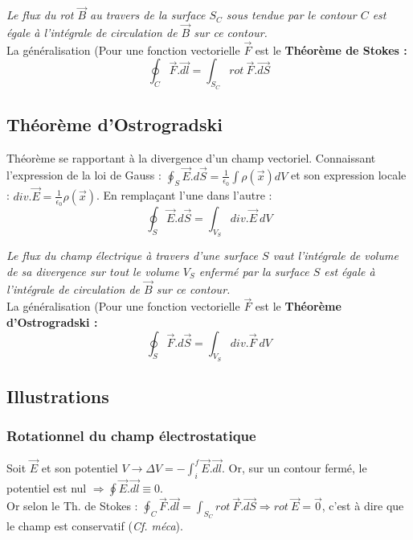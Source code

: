 \documentclass	[11pt, a4paper, openany]{book}
\begin{document}
\textit{Le flux du rot $\vec{B}$ au travers de la surface $S_C$ sous tendue par le contour $C$ est égale à l'intégrale de circulation de $\vec{B}$ sur ce contour.}\\
La généralisation (Pour une fonction vectorielle $\vec{F}$ est le \textbf{Théorème de Stokes :}
\begin{equation}
	\oint_C \vec{F}.\vec{dl} = \int_{S_C} rot\ \vec{F}.\vec{dS}
\end{equation}


\subsection{Théorème d'Ostrogradski}
Théorème se rapportant à la divergence d'un champ vectoriel. Connaissant l'expression de la loi de Gauss : $\oint_S \vec{E}.d\vec{S} = \frac{1}{\epsilon_0} \int \rho(\vec{x})dV$ et son expression locale : $div.\vec{E} = \frac{1}{\epsilon_0}\rho(\vec{x})$. En remplaçant l'une dans l'autre : 
\begin{equation}
	\oint_S \vec{E}.d\vec{S} = \int_{V_S} div.\vec{E}\ dV
\end{equation}

\textit{Le flux du champ électrique à travers d'une surface $S$ vaut l'intégrale de volume de sa divergence sur tout le volume $V_S$ enfermé par la surface $S$ est égale à l'intégrale de circulation de $\vec{B}$ sur ce contour.}\\

La généralisation (Pour une fonction vectorielle $\vec{F}$ est le \textbf{Théorème d'Ostrogradski :}
\begin{equation}
	\oint_S \vec{F}.d\vec{S} = \int_{V_S} div.\vec{F}\ dV
\end{equation}

\subsection{Illustrations}
\subsubsection{Rotationnel du champ électrostatique}
Soit $\vec{E}$ et son potentiel $V \rightarrow \Delta V = - \int_i^f \vec{E}.\vec{dl}$. Or, sur un contour fermé, le potentiel est nul $\Rightarrow \oint \vec{E}.\vec{dl} \equiv 0$.\\

Or selon le Th. de Stokes : $\oint_C \vec{F}.\vec{dl} = \int_{S_C} rot\ \vec{F}.\vec{dS} \Rightarrow rot\ \vec{E} = \vec{0}$, c'est à dire que le champ est conservatif (\textit{Cf. méca}).
\end{document}

